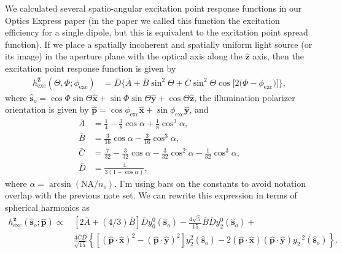 \documentclass[11pt]{article}
\providecommand{\so}[1]{\mathbf{\hat{s}}_o}
\providecommand{\mh}[1]{\mathbf{\hat{#1}}}
\begin{document}
We calculated several spatio-angular excitation point response functions in our
Optics Express paper \cite{chandler17} (in the paper we called this function the
excitation efficiency for a single dipole, but this is equivalent to the
excitation point spread function). If we place a spatially incoherent and
spatially uniform light source (or its image) in the aperture plane with the
optical axis along the $\mh{z}$ axis, then the excitation point response function
is given by
\begin{align}
  h^{\mh{z}}_{\text{exc}}(\Theta, \Phi; \phi_{\text{exc}}) &= \bar{D}\{\bar{A} + \bar{B}\sin^{2}{\Theta} + \bar{C}\sin^{2}{\Theta} \cos{[2 (\Phi - \phi_{\text{exc}}})]\}\label{eq:scalarabs},
\end{align}
where
$\so{} = \cos\Phi\sin\Theta\mh{x} + \sin\Phi\sin\Theta\mh{y} + \cos\Theta\mh{z}$,
the illumination polarizer orientation is given by $\mh{p} = \cos\phi_{\text{exc}}\mh{x} + \sin\phi_{\text{exc}}\mh{y}$, and 
\begin{subequations}
\begin{align}
  \bar{A} &= \frac{1}{4} - \frac{3}{8} \cos{\alpha } + \frac{1}{8} \cos^{3}{\alpha },\\
  \bar{B} &= \frac{3}{16} \cos{\alpha } - \frac{3}{16} \cos^{3}{\alpha },\\
  \bar{C} &= \frac{7}{32} - \frac{3}{32} \cos{\alpha } - \frac{3}{32} \cos^{2}{\alpha } - \frac{1}{32} \cos^{3}{\alpha},\\
  \bar{D} &= \frac{4}{3(1 - \cos\alpha)},
\end{align}\label{eq:coefficients}%
\end{subequations}
where $\alpha = \arcsin(\text{NA}/n_o)$. I'm using bars on the constants to
avoid notation overlap with the previous note set. We can rewrite this
expression in terms of spherical harmonics as
\begin{align}
  h^{\mh{z}}_{\text{exc}}(\so{}; \mh{p}) \propto\, &[2\bar{A} + (4/3)\bar{B}]\bar{D}y_0^0(\so{}) - \frac{4\sqrt{5}}{15}\bar{B}\bar{D}y_2^0(\so{}) + \nonumber\\ &\frac{4\bar{C}\bar{D}}{\sqrt{15}}\left\{[(\mh{p}\cdot\mh{x})^2 - (\mh{p}\cdot\mh{y})^2]y_2^2(\so{}) - 2(\mh{p}\cdot\mh{x})(\mh{p}\cdot\mh{y})y_2^{-2}(\so{})\right\}. \label{eq:genpsf}
\end{align}
\end{document}
